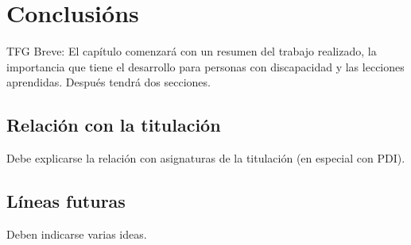 \chapter{Conclusións}
\label{cap:conclusiones}

TFG Breve: El capítulo comenzará con un resumen del trabajo realizado, la importancia que tiene el desarrollo para personas con discapacidad y las lecciones aprendidas. Después tendrá dos secciones.

\section{Relación con la titulación}
Debe explicarse la relación con asignaturas de la titulación (en especial con PDI).

\section{Líneas futuras}
Deben indicarse varias ideas.
